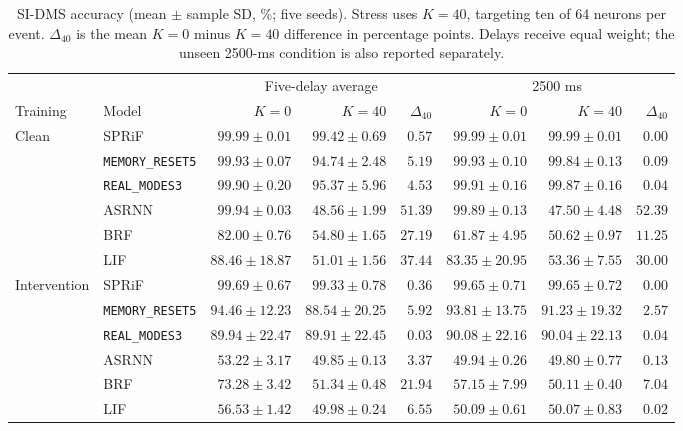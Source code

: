 \documentclass[letterpaper,journal]{IEEEtran}
\newcommand{\mr}{\textnormal{\texttt{MEMORY\_RESET5}}}
\newcommand{\rmodes}{\textnormal{\texttt{REAL\_MODES3}}}
\begin{document}
\begin{table}[t]
\caption{SI-DMS accuracy (mean $\pm$ sample SD, \%; five seeds). Stress uses $K=40$, targeting ten of 64 neurons per event. $\Delta_{40}$ is the mean $K=0$ minus $K=40$ difference in percentage points. Delays receive equal weight; the unseen 2500-ms condition is also reported separately.}
\label{tab:sidms_results}
\centering\footnotesize\setlength{\tabcolsep}{4pt}
\renewcommand{\arraystretch}{0.90}
\begin{tabular}{@{}llrrrrrr@{}}
\toprule
& & \multicolumn{3}{c}{Five-delay average} & \multicolumn{3}{c}{2500 ms}\\
\cmidrule(lr){3-5}\cmidrule(l){6-8}
Training & Model & $K=0$ & $K=40$ & $\Delta_{40}$ & $K=0$ & $K=40$ & $\Delta_{40}$\\
\midrule
Clean & SPRiF & $99.99\pm0.01$ & $99.42\pm0.69$ & $0.57$ & $99.99\pm0.01$ & $99.99\pm0.01$ & $0.00$\\
 & \mr & $99.93\pm0.07$ & $94.74\pm2.48$ & $5.19$ & $99.93\pm0.10$ & $99.84\pm0.13$ & $0.09$\\
 & \rmodes & $99.90\pm0.20$ & $95.37\pm5.96$ & $4.53$ & $99.91\pm0.16$ & $99.87\pm0.16$ & $0.04$\\
 & ASRNN & $99.94\pm0.03$ & $48.56\pm1.99$ & $51.39$ & $99.89\pm0.13$ & $47.50\pm4.48$ & $52.39$\\
 & BRF & $82.00\pm0.76$ & $54.80\pm1.65$ & $27.19$ & $61.87\pm4.95$ & $50.62\pm0.97$ & $11.25$\\
 & LIF & $88.46\pm18.87$ & $51.01\pm1.56$ & $37.44$ & $83.35\pm20.95$ & $53.36\pm7.55$ & $30.00$\\
\midrule
Intervention & SPRiF & $99.69\pm0.67$ & $99.33\pm0.78$ & $0.36$ & $99.65\pm0.71$ & $99.65\pm0.72$ & $0.00$\\
 & \mr & $94.46\pm12.23$ & $88.54\pm20.25$ & $5.92$ & $93.81\pm13.75$ & $91.23\pm19.32$ & $2.57$\\
 & \rmodes & $89.94\pm22.47$ & $89.91\pm22.45$ & $0.03$ & $90.08\pm22.16$ & $90.04\pm22.13$ & $0.04$\\
 & ASRNN & $53.22\pm3.17$ & $49.85\pm0.13$ & $3.37$ & $49.94\pm0.26$ & $49.80\pm0.77$ & $0.13$\\
 & BRF & $73.28\pm3.42$ & $51.34\pm0.48$ & $21.94$ & $57.15\pm7.99$ & $50.11\pm0.40$ & $7.04$\\
 & LIF & $56.53\pm1.42$ & $49.98\pm0.24$ & $6.55$ & $50.09\pm0.61$ & $50.07\pm0.83$ & $0.02$\\
\bottomrule
\end{tabular}
\end{table}
\end{document}
